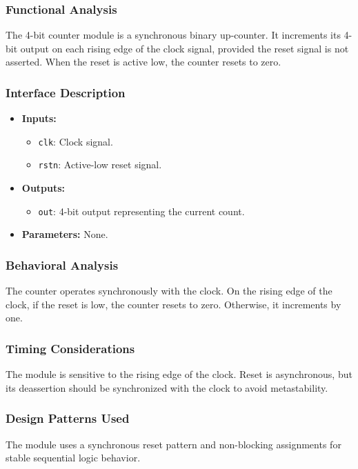\documentclass[10pt]{article}
\begin{document}
\subsubsection{Functional Analysis}
The 4-bit counter module is a synchronous binary up-counter. It increments its 4-bit output on each rising edge of the clock signal, provided the reset signal is not asserted. When the reset is active low, the counter resets to zero.

\subsubsection{Interface Description}
\begin{itemize}
    \item \textbf{Inputs:}
    \begin{itemize}
        \item \texttt{clk}: Clock signal.
        \item \texttt{rstn}: Active-low reset signal.
    \end{itemize}
    \item \textbf{Outputs:}
    \begin{itemize}
        \item \texttt{out}: 4-bit output representing the current count.
    \end{itemize}
    \item \textbf{Parameters:} None.
\end{itemize}

\subsubsection{Behavioral Analysis}
The counter operates synchronously with the clock. On the rising edge of the clock, if the reset is low, the counter resets to zero. Otherwise, it increments by one.

\subsubsection{Timing Considerations}
The module is sensitive to the rising edge of the clock. Reset is asynchronous, but its deassertion should be synchronized with the clock to avoid metastability.

\subsubsection{Design Patterns Used}
The module uses a synchronous reset pattern and non-blocking assignments for stable sequential logic behavior.
\end{document}
